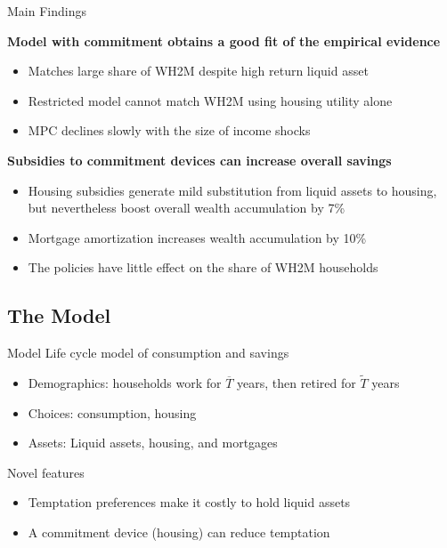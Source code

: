 \documentclass[10pt,english,t,10pt]{beamer}
\begin{document}
\begin{frame} {Main Findings} \label{findings}

\textbf{Model with commitment obtains a good fit of the empirical evidence}
\begin{itemize}
	\medskip
	\item Matches large share of WH2M despite high return liquid asset
	\medskip
	\item Restricted model cannot match WH2M using housing utility alone
	\medskip
	\item MPC declines slowly with the size of income shocks
\end{itemize}
\medskip \medskip \medskip
\pause

\textbf{Subsidies to commitment devices can increase overall savings}
\begin{itemize}
	\medskip
	\item Housing subsidies generate mild substitution from liquid assets to housing, but nevertheless boost overall wealth accumulation by 7\%
	\medskip 
	\item Mortgage amortization increases wealth accumulation by 10\%
	\medskip
	\item The policies have little effect on the share of WH2M households
\end{itemize}



\end{frame}


\subsection{The Model}


\begin{frame}{Model}
\medskip
Life cycle model of consumption and savings
\begin{itemize}
\medskip \medskip
\item Demographics: households work for $\overline{T}$ years, then retired for $\widetilde{T}$ years
\medskip \medskip
\item Choices: consumption, housing
\medskip \medskip
\item Assets: Liquid assets, housing, and mortgages
\medskip \medskip \medskip \medskip
\end{itemize}

\pause
Novel features
\medskip \medskip
\begin{itemize}
\item Temptation preferences make it costly to hold liquid assets
\medskip \medskip
\item A commitment device (housing) can reduce temptation
\end{itemize}
\end{frame}
\end{document}
